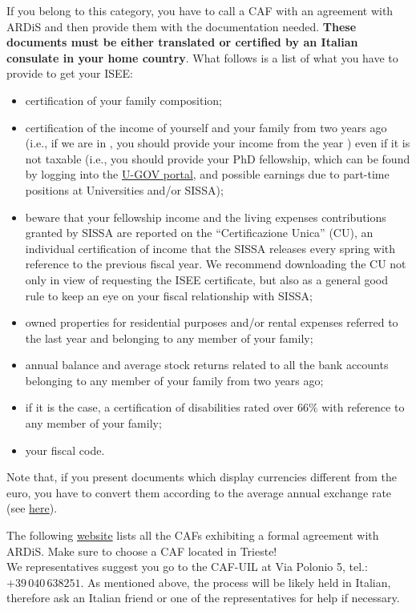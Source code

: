 \documentclass{sissavademecum}
\begin{document}
If you belong to this category, you have to call a CAF with an agreement with ARDiS and then provide them with the documentation needed. \textbf{These documents must be either translated or certified by an Italian consulate in your home country}. What follows is a list of what you have to provide to get your ISEE:
\begin{itemize}
    \item certification of your family composition;
    \item certification of the income of yourself and your family from two years ago (i.e., if we are in \the\year, you should provide your income from the year \the\year) even if it is not taxable (i.e., you should provide your PhD fellowship, which can be found by logging into the \href{https://www.sissa.u-gov.it/u-gov-ru/bp/desktop.RU99CEDOLID_1914958969.RU99CEDOL/siaru/cedolini/cedolini_main.iface}{U-GOV portal}, and possible earnings due to part-time positions at Universities and/or SISSA);
    \item beware that your fellowship income and the living expenses contributions granted by SISSA are reported on the ``Certificazione Unica'' (CU), an individual certification of income that the SISSA releases every spring with reference to the previous fiscal year. We recommend downloading the CU not only in view of requesting the ISEE certificate, but also as a general good rule to keep an eye on your fiscal relationship with SISSA;
    \item owned properties for residential purposes and/or rental expenses referred to the last year and belonging to any member of your family;
    \item annual balance and average stock returns related to all the bank accounts belonging to any member of your family from two years ago;
    \item if it is the case, a certification of disabilities rated over $66\%$ with reference to any member of your family;
    \item your fiscal code.
\end{itemize}
Note that, if you present documents which display currencies different from the euro, you have to convert them according to the average annual exchange rate (see \href{https://tassidicambio.bancaditalia.it/terzevalute-wf-ui-web/averageRates}{here}).
    
The following \href{http://www.ardiss.fvg.it/contenuti.php?view=news&id=9518&tipo=evidenza}{website} lists all the CAFs exhibiting a formal agreement with ARDiS. Make sure to choose a CAF located in Trieste! \\
We representatives suggest you go to the CAF-UIL at Via Polonio 5, tel.: $+39 \, 040 \, 638251$. As mentioned above, the process will be likely held in Italian, therefore ask an Italian friend or one of the representatives for help if necessary.
\end{document}
